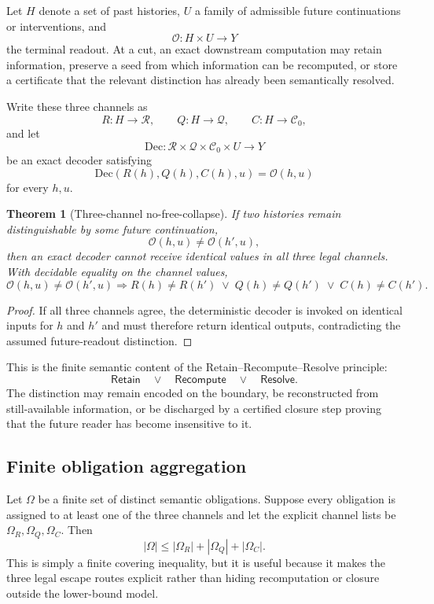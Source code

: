 \documentclass[11pt]{article}
\newtheorem{theorem}{Theorem}[section]
\newcommand{\Readout}{\mathcal{O}}
\newcommand{\Retain}{\mathsf{Retain}}
\newcommand{\Recompute}{\mathsf{Recompute}}
\newcommand{\Resolve}{\mathsf{Resolve}}
\begin{document}
Let $H$ denote a set of past histories, $U$ a family of admissible future continuations or interventions, and
\[
\Readout:H\times U\to Y
\]
the terminal readout. At a cut, an exact downstream computation may retain information, preserve a seed from which information can be recomputed, or store a certificate that the relevant distinction has already been semantically resolved.

Write these three channels as
\[
R:H\to\mathcal R,\qquad
Q:H\to\mathcal Q,\qquad
C:H\to\mathcal C_0,
\]
and let
\[
\mathrm{Dec}:\mathcal R\times\mathcal Q\times\mathcal C_0\times U\to Y
\]
be an exact decoder satisfying
\[
\mathrm{Dec}(R(h),Q(h),C(h),u)=\Readout(h,u)
\]
for every $h,u$.

\begin{theorem}[Three-channel no-free-collapse]
If two histories remain distinguishable by some future continuation,
\[
\Readout(h,u)\neq\Readout(h',u),
\]
then an exact decoder cannot receive identical values in all three legal channels. With decidable equality on the channel values,
\[
\boxed{
\Readout(h,u)\neq\Readout(h',u)
\Longrightarrow
R(h)\neq R(h')\;\lor\;Q(h)\neq Q(h')\;\lor\;C(h)\neq C(h').
}
\]
\end{theorem}
\begin{proof}
If all three channels agree, the deterministic decoder is invoked on identical inputs for $h$ and $h'$ and must therefore return identical outputs, contradicting the assumed future-readout distinction.
\end{proof}

This is the finite semantic content of the Retain--Recompute--Resolve principle:
\[
\boxed{\Retain\quad\lor\quad\Recompute\quad\lor\quad\Resolve.}
\]
The distinction may remain encoded on the boundary, be reconstructed from still-available information, or be discharged by a certified closure step proving that the future reader has become insensitive to it.

\subsection{Finite obligation aggregation}

Let $\Omega$ be a finite set of distinct semantic obligations. Suppose every obligation is assigned to at least one of the three channels and let the explicit channel lists be $\Omega_R,\Omega_Q,\Omega_C$. Then
\[
|\Omega|
\le
|\Omega_R|+|\Omega_Q|+|\Omega_C|.
\]
This is simply a finite covering inequality, but it is useful because it makes the three legal escape routes explicit rather than hiding recomputation or closure outside the lower-bound model.
\end{document}
